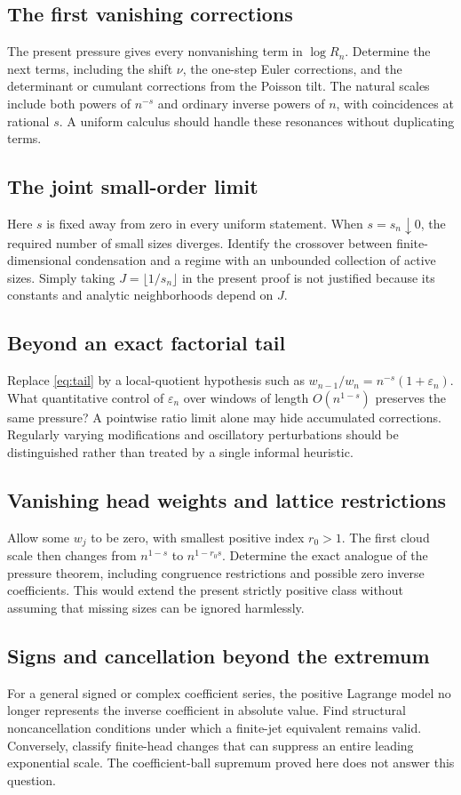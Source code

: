 \documentclass[11pt,a4paper]{article}
\theoremstyle{definition}
\theoremstyle{remark}
\numberwithin{equation}{section}
\begin{document}
\subsection{The first vanishing corrections}
The present pressure gives every nonvanishing term in $\log R_n$.
Determine the next terms, including the shift $\nu$, the one-step
Euler corrections, and the determinant or cumulant corrections from
the Poisson tilt. The natural scales include both powers of $n^{-s}$
and ordinary inverse powers of $n$, with coincidences at rational $s$.
A uniform calculus should handle these resonances without duplicating
terms.

\subsection{The joint small-order limit}
Here $s$ is fixed away from zero in every uniform statement.
When $s=s_n\downarrow0$, the required number of small sizes diverges.
Identify the crossover between finite-dimensional condensation and a
regime with an unbounded collection of active sizes. Simply taking
$J=\lfloor1/s_n\rfloor$ in the present proof is not justified because
its constants and analytic neighborhoods depend on $J$.

\subsection{Beyond an exact factorial tail}
Replace \eqref{eq:tail} by a local-quotient hypothesis such as
$w_{n-1}/w_n=n^{-s}(1+\varepsilon_n)$. What quantitative control of
$\varepsilon_n$ over windows of length $O(n^{1-s})$ preserves the same
pressure? A pointwise ratio limit alone may hide accumulated corrections.
Regularly varying modifications and oscillatory perturbations should
be distinguished rather than treated by a single informal heuristic.

\subsection{Vanishing head weights and lattice restrictions}
Allow some $w_j$ to be zero, with smallest positive index $r_0>1$.
The first cloud scale then changes from $n^{1-s}$ to
$n^{1-r_0s}$. Determine the exact analogue of the pressure theorem,
including congruence restrictions and possible zero inverse
coefficients. This would extend the present strictly positive class
without assuming that missing sizes can be ignored harmlessly.

\subsection{Signs and cancellation beyond the extremum}
For a general signed or complex coefficient series, the positive
Lagrange model no longer represents the inverse coefficient in absolute
value. Find structural noncancellation conditions under which a
finite-jet equivalent remains valid. Conversely, classify finite-head
changes that can suppress an entire leading exponential scale.
The coefficient-ball supremum proved here does not answer this question.
\end{document}
